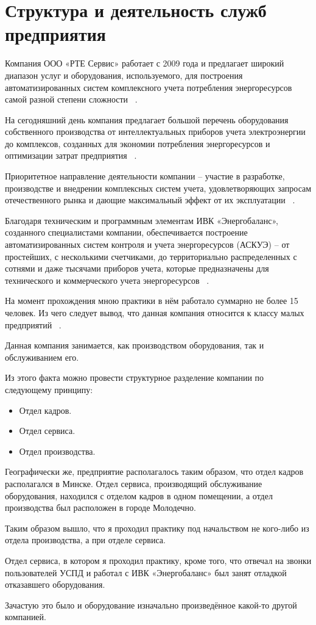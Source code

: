 \section{Структура и деятельность служб предприятия}

Компания ООО «РТЕ Сервис» работает с 2009 года
и предлагает широкий диапазон услуг и оборудования, используемого, для
построения автоматизированных систем
комплексного учета потребления энергоресурсов
самой разной степени сложности ~\cite{rte-about}.

На сегодняшний день компания предлагает
большой перечень оборудования собственного производства
от интеллектуальных приборов учета электроэнергии
до комплексов, созданных для экономии потребления энергоресурсов
и оптимизации затрат предприятия ~\cite{rte-about}.

Приоритетное направление деятельности компании – участие в разработке,
производстве и внедрении комплексных систем учета, удовлетворяющих
запросам отечественного рынка и дающие максимальный эффект от их
эксплуатации ~\cite{rte-about}.

Благодаря техническим и программным элементам ИВК «Энергобаланс»,
созданного специалистами компании,
обеспечивается построение\\
автоматизированных систем контроля
и учета энергоресурсов (АСКУЭ) – от простейших,
с несколькими счетчиками,
до территориально распределенных с сотнями и даже тысячами приборов учета,
которые предназначены для технического
и коммерческого учета энергоресурсов ~\cite{rte-about}.

На момент прохождения мною практики
в нём работало суммарно не более 15 человек.
Из чего следует вывод,
что данная компания относится к классу малых предприятий ~\cite{mal-biznes-ru}.


Данная компания занимается, как производством оборудования,
так и обслуживанием его.

Из этого факта можно провести структурное разделение компании
по следующему принципу:
\begin{itemize}
\item Отдел кадров.
\item Отдел сервиса.
\item Отдел производства.
\end{itemize}

Географически же, предприятие располагалось таким образом,
что отдел кадров располагался в Минске. Отдел сервиса,
производящий обслуживание оборудования,
находился с отделом кадров в одном помещении, а отдел
производства был расположен в городе Молодечно.

Таким образом вышло,
что я проходил практику под начальством не кого-либо из отдела производства,
а при отделе сервиса.

Отдел сервиса, в котором я проходил практику, кроме того,
что отвечал на звонки пользователей УСПД и работал с
ИВК «Энергобаланс» был занят отладкой отказавшего
оборудования.

Зачастую это было и оборудование изначально произведённое
какой-то другой компанией.

\newpage

